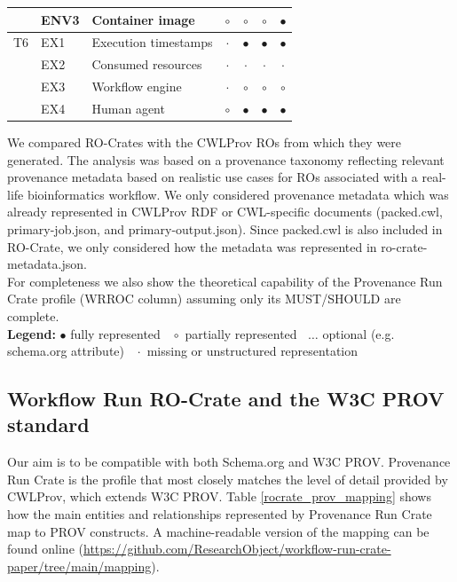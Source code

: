 \documentclass[10pt,letterpaper]{article}
\begin{document}
\begin{table}[!ht]
\begin{adjustwidth}{-1.4cm}{0in}
\begin{tabular}{r|l|l|c|c|c|c}
& ENV3 & Container image & $\circ$ & $\circ$ &  $\circ$ & $\bullet$ \\ \hline 
T6 & EX1 & Execution timestamps & $\cdot$ & $\bullet$ & $\bullet$ & $\bullet$ \\ 
& EX2 & Consumed resources &  $\cdot$ & $\cdot$ & $\cdot$ & $\cdot$  \\ 
& EX3 & Workflow engine & $\cdot$ & $\circ$ & $\circ$ & $\circ$  \\  
& EX4 & Human agent & $\circ$ & $\bullet$ & $\bullet$ & $\bullet$ \\ \hline
\end{tabular}
\begin{flushleft} We compared RO-Crates with the CWLProv ROs from which they were generated.
The analysis was based on a provenance taxonomy reflecting relevant provenance metadata based on realistic use cases for ROs associated with a real-life bioinformatics workflow.
We only considered provenance metadata which was already represented in CWLProv RDF or CWL-specific documents (packed.cwl, primary-job.json, and primary-output.json).
Since packed.cwl is also included in RO-Crate, we only considered how the metadata was represented in ro-crate-metadata.json.\\
For completeness we also show the theoretical capability of the Provenance Run Crate profile (WRROC column) assuming only its MUST/SHOULD are complete.\\
\textbf{Legend:} $\bullet$ fully represented  $\;\;\circ$ partially represented  $\;\;\dots$ optional (e.g. schema.org attribute) $\;\;\cdot$ missing or unstructured representation
\end{flushleft}
\label{analysis_table}
\end{adjustwidth}
\end{table}


\subsection{Workflow Run RO-Crate and the W3C PROV standard}

Our aim is to be compatible with both Schema.org and W3C PROV. Provenance Run Crate is the profile that most closely matches the level of detail provided by CWLProv, which extends W3C PROV. Table \ref{rocrate_prov_mapping} shows how the main entities and relationships represented by Provenance Run Crate map to PROV constructs. A machine-readable version of the mapping can be found online (\url{https://github.com/ResearchObject/workflow-run-crate-paper/tree/main/mapping}).
\end{document}
